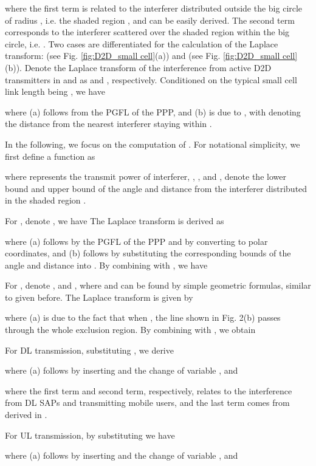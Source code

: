 \documentclass[twocolumn,english]{IEEEtran}
\theoremstyle{plain}
\theoremstyle{definition}
\begin{document}
where the first term is related to the interferer distributed outside
the big circle of radius , i.e.
the shaded region  ,
and can be easily derived. The second term corresponds to the interferer
scattered over the shaded region within the big circle, i.e. .
Two cases are differentiated for the calculation of the Laplace transform:
 (see Fig. \ref{fig:D2D_small cell}(a))
and  (see Fig. \ref{fig:D2D_small cell}(b)).
Denote the Laplace transform of the interference from active D2D transmitters
in  and 
as  and , respectively.
Conditioned on the typical small cell link length being ,
we have

where (a) follows from the PGFL of the PPP, and (b) is due to ,
with  denoting the distance
from the nearest interferer staying within .

In the following, we focus on the computation of .
For notational simplicity, we first define a  function
as

where  represents the transmit power of interferer, ,
, and ,  denote the lower bound
and upper bound of the angle and distance from the interferer distributed
in the shaded region .

For , denote ,
we have 
The Laplace transform 
is derived as

where (a) follows by the PGFL of the PPP and by converting to polar
coordinates, and (b) follows by substituting the corresponding bounds
of the angle and distance into . By combining
 with , we have



For , denote ,
 and , where  and
 can be found by simple geometric formulas, similar to 
given before. The Laplace transform 
is given by

where (a) is due to the fact that when ,
the line  shown in Fig. 2(b) passes through the whole
exclusion region. By combining  with ,
we obtain



For DL transmission, substituting ,
we derive

where (a) follows by inserting 
and the change of variable , and

where the first term and second term, respectively, relates to the
interference from DL SAPs and transmitting mobile users, and the last
term comes from  derived in .

For UL transmission, by substituting 
we have

where (a) follows by inserting 
and the change of variable , and
\end{document}

